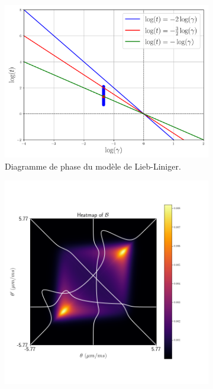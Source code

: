 \begin{figure}[H]
	\centering
	\begin{subfigure}[b]{0.45\textwidth}
		\includegraphics[width=\textwidth]{Figures/04_GGE_Fluctuation/diagram.png}
		\caption{Diagramme de phase du modèle de Lieb-Liniger.}
		\label{chap:4:fig:diagr}
	\end{subfigure}
	\hfill
	\begin{subfigure}[b]{0.45\textwidth}
		\includegraphics[width=\textwidth]{Figures/04_GGE_Fluctuation/fluctu.png}

\end{subfigure}
\end{figure}
